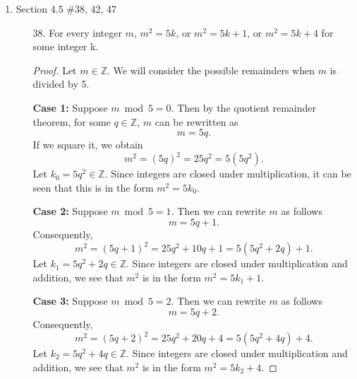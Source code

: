 \documentclass[12pt]{article}
\newcommand{\odd}[0]{\mathbb{Z} - 2\mathbb{Z}}
\begin{document}
\begin{enumerate}
\begin{enumerate}
\begin{proof}
                Now consider \(a-c\):
                \[
                a - c = (a - b) + (b - c).
                \]
                
                Substitute the expressions for \(a - b\) and \(b - c\):
                \[
                a - c = (2k_1 + 1) + 2k_2 = 2k_1 + 2k_2 + 1 = 2(k_1 + k_2) + 1.
                \]
                
                Since \(k_1 + k_2 \in \mathbb{Z}\), we can see that \(a - c = 2(k_1 + k_2) + 1 \in \odd\),
                
                Therefore, if \(a-b\) is odd and \(b-c\) is even, \(a-c\) must be odd.
                \end{proof}
                
        \end{enumerate}

        \newpage


    \item Section 4.5 \#38, 42, 47
        \begin{enumerate}
            \item[38.] For every integer $m$, $m^2 = 5k$, or $m^2 = 5k+1$, or $m^2 = 5k+4$ for some integer k. 
                \begin{proof}
                Let \( m \in \mathbb{Z} \). We will consider the possible remainders when \( m \) is divided by 5. 
                
                \textbf{Case 1:} Suppose \( m \bmod 5 = 0 \). Then by the quotient remainder theorem, for some \( q \in \mathbb{Z} \), \( m \) can be rewritten as
                \[ m = 5q. \]
                If we square it, we obtain
                \[ m^2 = (5q)^2 = 25q^2 = 5(5q^2). \]
                Let \( k_0 = 5q^2 \in \mathbb{Z} \). Since integers are closed under multiplication, it can be seen that this is in the form \( m^2 = 5k_0 \).
                
                \textbf{Case 2:} Suppose \( m \bmod 5 = 1 \). Then we can rewrite \( m \) as follows
                \[ m = 5q + 1. \]
                Consequently,
                \[ m^2 = (5q + 1)^2 = 25q^2 + 10q + 1 = 5(5q^2 + 2q) + 1. \]
                Let \( k_1 = 5q^2 + 2q \in \mathbb{Z} \). Since integers are closed under multiplication and addition, we see that \( m^2 \) is in the form \( m^2 = 5k_1 + 1 \).
                
                \textbf{Case 3:} Suppose \( m \bmod 5 = 2 \). Then we can rewrite \( m \) as follows
                \[ m = 5q + 2. \]
                Consequently,
                \[ m^2 = (5q + 2)^2 = 25q^2 + 20q + 4 = 5(5q^2 + 4q) + 4. \]
                Let \( k_2 = 5q^2 + 4q \in \mathbb{Z} \). Since integers are closed under multiplication and addition, we see that \( m^2 \) is in the form \( m^2 = 5k_2 + 4 \).
                

\end{proof}
\end{enumerate}
\end{enumerate}
\end{document}
